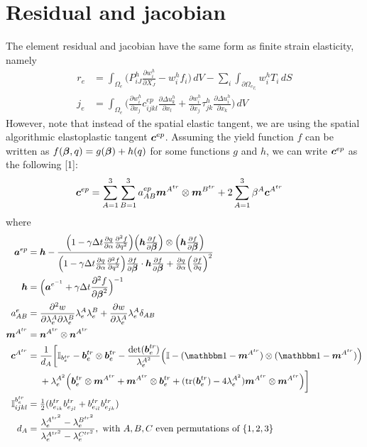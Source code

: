 \documentclass[10pt]{article}
\begin{document}
\section{Residual and jacobian}
The element residual and jacobian have the same form as finite strain elasticity, namely
\begin{align}
r_e &= \int_{\Omega_e} \Big(P^h_{iJ} \frac{\partial w^h_i}{\partial X_J} - w^h_i f_i \Big) \, dV
- \sum_i \int_{\partial \Omega_{e_{T_i}}} w^h_i T_i \, dS\\
j_e &=  \int_{\Omega_e} \Big( \frac{\partial w^h_i}{\partial x_j} c^{ep}_{ijkl} \frac{\partial \Delta u^h_k}{\partial x_l} 
+ \frac{\partial w^h_i}{\partial x_j} \tau^h_{jk} \frac{\partial \Delta u^h_i}{\partial x_k} \Big) \, dV
\end{align}
However, note that instead of the spatial elastic tangent, we are using the spatial algorithmic elastoplastic tangent $\mbox{\boldmath$ c$}^{ep}$. Assuming the yield function $f$ can be written as $f(\mbox{\boldmath$\beta$},q) = g(\mbox{\boldmath$\beta$}) + h(q)$ for some functions $g$ and $h$, we can write $\mbox{\boldmath$ c$}^{ep}$ as the following [1]:
\begin{align}
\mbox{\boldmath$ c$}^{ep} &= \sum_{A=1}^3 \sum_{B=1}^3 a^{ep}_{AB} \mbox{\boldmath$ m$}^{A^{tr}}\otimes\mbox{\boldmath$ m$}^{B^{tr}}
+
2\sum_{A=1}^3 \beta^A \mbox{\boldmath$ c$}^{A^{tr}}
\end{align}
where
\begin{align}
\ba^{ep} &= \bh - \frac{\Big(1 - \gamma \Delta t \frac{\partial q}{\partial \alpha} \frac{\partial^2 f}{\partial q^2}\Big)
\Big(\bh \frac{\partial f}{\partial \Bbeta} \Big)\otimes\Big(\bh \frac{\partial f}{\partial \Bbeta} \Big)}
{\Big(1 - \gamma \Delta t \frac{\partial q}{\partial \alpha} \frac{\partial^2 f}{\partial q^2}\Big)
\frac{\partial f}{\partial \Bbeta}\cdot\bh \frac{\partial f}{\partial \Bbeta}
+ \frac{\partial q}{\partial \alpha}\Big(\frac{\partial f}{\partial q}\Big)^2}\\
\bh &= \Big(\ba^{e^{-1}} + \gamma \Delta t \frac{\partial^2 f}{\partial \Bbeta^2}
\Big)^{-1}\\
a^e_{AB} &= \frac{\partial^2 w}{\partial \lambda^A_e \partial \lambda^B_e}
\lambda^A_e \lambda^B_e
+
\frac{\partial w}{\partial \lambda^A_e}
\lambda^A_e \delta_{AB}\\
\bm^{A^{tr}} &= \bn^{A^{tr}}\otimes\bn^{A^{tr}}\\
\bc^{A^{tr}} &=
\begin{aligned}[t]
&\frac{1}{d_A} \bigg[
\mathbb{I}_{b^{tr}_e} - \bb^{tr}_e \otimes \bb^{tr}_e - \frac{\det(\bb^{tr}_e)}{\lambda^{A^{2}}_e}
\Big(
\mathbb{I} - (\iso - \bm^{A^{tr}})\otimes(\iso - \bm^{A^{tr}})
\Big)\\
&+
\lambda^{A^{2}}_e
\Big(
\bb^{tr}_e \otimes\bm^{A^{tr}} + \bm^{A^{tr}} \otimes\bb^{tr}_e
+
(\tr(\bb^{tr}_e) - 4\lambda^{A^{2}}_e)\bm^{A^{tr}}\otimes\bm^{A^{tr}}
\Big)
\bigg]
\end{aligned}\\
\mathbb{I}^{b^{tr}_e}_{ijkl} &= \half(b^{tr}_{e_{ik}}b^{tr}_{e_{jl}} + b^{tr}_{e_{il}}b^{tr}_{e_{jk}})\\
d_A &= \frac{\lambda^{A^{tr^2}}_e - \lambda^{B^{tr^2}}_e}{\lambda^{A^{tr^2}}_e - \lambda^{C^{tr^2}}_e}, 
\text{ with $A,B,C$ even permutations of } \{1,2,3\}
\end{align}
\end{document}

